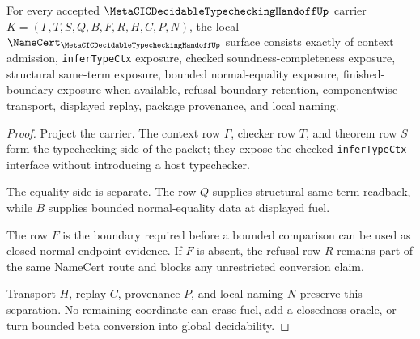 \begin{theorem}
\label{thm:metacic-decidable-typechecking-handoff-obligations}
For every accepted $\MetaCICDecidableTypecheckingHandoffUp$ carrier $K=(\Gamma,T,S,Q,B,F,R,H,C,P,N)$, the local $\NameCert_{\MetaCICDecidableTypecheckingHandoffUp}$ surface consists exactly of context admission, \texttt{inferTypeCtx} exposure, checked soundness-completeness exposure, structural same-term exposure, bounded normal-equality exposure, finished-boundary exposure when available, refusal-boundary retention, componentwise transport, displayed replay, package provenance, and local naming.
\end{theorem}
\begin{proof}
Project the carrier. The context row $\Gamma$, checker row $T$, and theorem row $S$ form the typechecking side of the packet; they expose the checked \texttt{inferTypeCtx} interface without introducing a host typechecker.

The equality side is separate. The row $Q$ supplies structural same-term readback, while $B$ supplies bounded normal-equality data at displayed fuel.

The row $F$ is the boundary required before a bounded comparison can be used as closed-normal endpoint evidence. If $F$ is absent, the refusal row $R$ remains part of the same NameCert route and blocks any unrestricted conversion claim.

Transport $H$, replay $C$, provenance $P$, and local naming $N$ preserve this separation. No remaining coordinate can erase fuel, add a closedness oracle, or turn bounded beta conversion into global decidability.
\end{proof}

